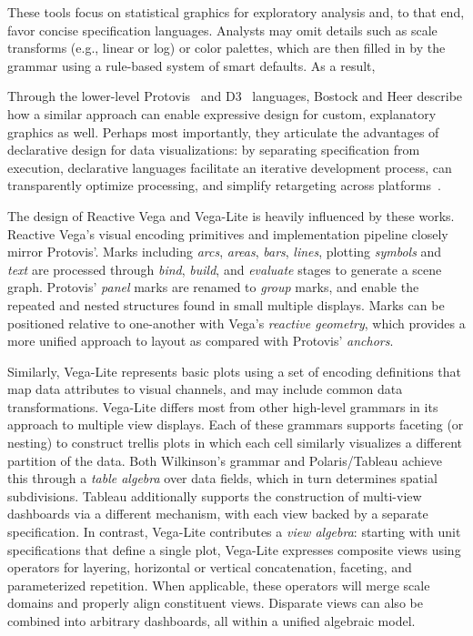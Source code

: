 These tools focus on statistical graphics for exploratory analysis and, to that
end, favor concise specification languages. Analysts may omit details such as
scale transforms (e.g., linear or log) or color palettes, which are then filled
in by the grammar using a rule-based system of smart defaults. As a result,

Through the lower-level Protovis~\cite{bostock:protovis,heer:protovisjava} and
D3~\cite{bostock:d3} languages, Bostock and Heer describe how a similar approach
can enable expressive design for custom, explanatory graphics as well. Perhaps
most importantly, they articulate the advantages of declarative design for data
visualizations: by separating specification from execution, declarative
languages facilitate an iterative development process, can transparently
optimize processing, and simplify retargeting across
platforms~\cite{heer:protovisjava}.

The design of Reactive Vega and Vega-Lite is heavily influenced by these works.
Reactive Vega's visual encoding primitives and implementation pipeline closely
mirror Protovis'. Marks including \emph{arcs}, \emph{areas}, \emph{bars},
\emph{lines}, plotting \emph{symbols} and \emph{text} are processed through
\emph{bind}, \emph{build}, and \emph{evaluate} stages to generate a scene graph.
Protovis' \emph{panel} marks are renamed to \emph{group} marks, and enable the
repeated and nested structures found in small multiple displays. Marks can be
positioned relative to one-another with Vega's \emph{reactive geometry}, which
provides a more unified approach to layout as compared with Protovis'
\emph{anchors}.

Similarly, Vega-Lite represents basic plots using a set of encoding definitions
that map data attributes to visual channels, and may include common data
transformations. Vega-Lite differs most from other high-level grammars in its
approach to multiple view displays. Each of these grammars supports faceting (or
nesting) to construct trellis plots in which each cell similarly visualizes a
different partition of the data. Both Wilkinson's grammar and Polaris/Tableau
achieve this through a \emph{table algebra} over data fields, which in turn
determines spatial subdivisions. Tableau additionally supports the construction
of multi-view dashboards via a different mechanism, with each view backed by a
separate specification. In contrast, Vega-Lite contributes a \emph{view
algebra}: starting with unit specifications that define a single plot, Vega-Lite
expresses composite views using operators for layering, horizontal or vertical
concatenation, faceting, and parameterized repetition. When applicable, these
operators will merge scale domains and properly align constituent views.
Disparate views can also be combined into arbitrary dashboards, all within a
unified algebraic model.

